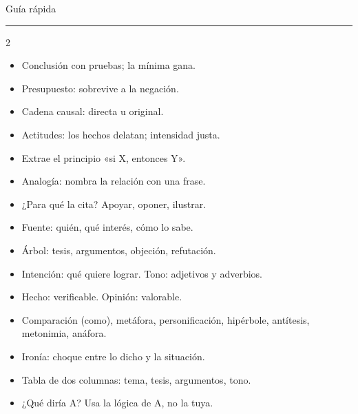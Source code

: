 \makeatletter
\cleardoublepage\renewcommand{\zuka@mundoactual}{Guía rápida}
{\sffamily\fontsize{26}{30}\selectfont\firalight Guía rápida\par}\vspace{2pt}
{\color{zlime}\rule{18mm}{1.6pt}}\par\vspace{6pt}

\begin{multicols}{2}\small
{}
\begin{itemize}
  \item Conclusión con pruebas; la mínima gana.
  \item Presupuesto: sobrevive a la negación.
  \item Cadena causal: directa u original.
  \item Actitudes: los hechos delatan; intensidad justa.
\end{itemize}
\begin{itemize}
  \item Extrae el principio «si X, entonces Y».
  \item Analogía: nombra la relación con una frase.
\end{itemize}
\begin{itemize}
  \item ¿Para qué la cita? Apoyar, oponer, ilustrar.
  \item Fuente: quién, qué interés, cómo lo sabe.
\end{itemize}
\columnbreak
{}
\begin{itemize}
  \item Árbol: tesis, argumentos, objeción, refutación.
  \item Intención: qué quiere lograr. Tono: adjetivos y adverbios.
  \item Hecho: verificable. Opinión: valorable.
\end{itemize}
\begin{itemize}
  \item Comparación (como), metáfora, personificación, hipérbole, antítesis, metonimia, anáfora.
  \item Ironía: choque entre lo dicho y la situación.
\end{itemize}
\begin{itemize}
  \item Tabla de dos columnas: tema, tesis, argumentos, tono.
  \item ¿Qué diría A? Usa la lógica de A, no la tuya.
\end{itemize}
\end{multicols}

